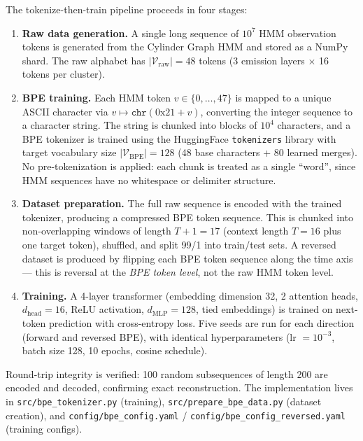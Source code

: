 \documentclass[11pt]{article}
\begin{document}
The tokenize-then-train pipeline proceeds in four stages:

\begin{enumerate}
\item \textbf{Raw data generation.}  A single long sequence of $10^7$ HMM observation tokens is generated from the Cylinder Graph HMM and stored as a NumPy shard.  The raw alphabet has $|\mathcal{V}_{\mathrm{raw}}| = 48$ tokens (3 emission layers $\times$ 16 tokens per cluster).

\item \textbf{BPE training.}  Each HMM token $v \in \{0, \ldots, 47\}$ is mapped to a unique ASCII character via $v \mapsto \texttt{chr}(0\text{x}21 + v)$, converting the integer sequence to a character string.  The string is chunked into blocks of $10^4$ characters, and a BPE tokenizer is trained using the HuggingFace \texttt{tokenizers} library with target vocabulary size $|\mathcal{V}_{\mathrm{BPE}}| = 128$ (48 base characters + 80 learned merges).  No pre-tokenization is applied: each chunk is treated as a single ``word'', since HMM sequences have no whitespace or delimiter structure.

\item \textbf{Dataset preparation.}  The full raw sequence is encoded with the trained tokenizer, producing a compressed BPE token sequence.  This is chunked into non-overlapping windows of length $T+1 = 17$ (context length $T = 16$ plus one target token), shuffled, and split 99/1 into train/test sets.  A reversed dataset is produced by flipping each BPE token sequence along the time axis --- this is reversal at the \emph{BPE token level}, not the raw HMM token level.

\item \textbf{Training.}  A 4-layer transformer (embedding dimension 32, 2 attention heads, $d_{\mathrm{head}} = 16$, ReLU activation, $d_{\mathrm{MLP}} = 128$, tied embeddings) is trained on next-token prediction with cross-entropy loss.  Five seeds are run for each direction (forward and reversed BPE), with identical hyperparameters (lr $= 10^{-3}$, batch size 128, 10 epochs, cosine schedule).
\end{enumerate}

Round-trip integrity is verified: 100 random subsequences of length 200 are encoded and decoded, confirming exact reconstruction.  The implementation lives in \texttt{src/bpe\_tokenizer.py} (training), \texttt{src/prepare\_bpe\_data.py} (dataset creation), and \texttt{config/bpe\_config.yaml} / \texttt{config/bpe\_config\_reversed.yaml} (training configs).
\end{document}
